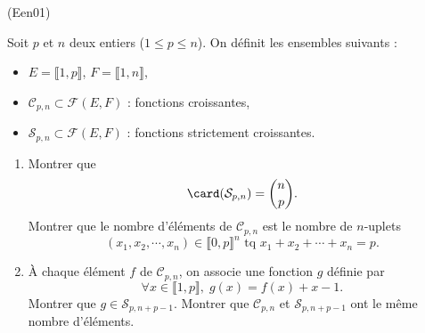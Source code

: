 \begin{tiny}(Een01)\end{tiny} 
Soit $p$ et $n$ deux entiers ($1\leq p\leq n$). On définit les ensembles suivants :
\begin{itemize}
 \item $E = \llbracket 1,p \rrbracket$,  $F = \llbracket 1,n \rrbracket$,
 \item $\mathcal{C}_{p,n}\subset \mathcal{F}(E,F)$ : fonctions croissantes,
 \item $\mathcal{S}_{p,n}\subset \mathcal{F}(E,F)$ : fonctions strictement croissantes.
\end{itemize}
\begin{enumerate}
\item  Montrer que 
\begin{displaymath}
\card(\mathcal{S}_{p,n})= \binom{n}{p}.
\end{displaymath}
Montrer que le nombre d'{\'e}l{\'e}ments de $\mathcal{C}_{p,n}$ est le nombre de $n$-uplets 
\begin{displaymath}
 \left( x_{1},x_{2},\cdots ,x_{n}\right)\in\llbracket 0,p \rrbracket^n \text{ tq } x_{1}+x_{2}+\cdots +x_{n}=p.
\end{displaymath}
\item  \`A chaque {\'e}l{\'e}ment $f$ de $\mathcal{C}_{p,n}$, on associe une fonction $g$ d{\'e}finie par
\[
\forall x\in \llbracket 1, p\rrbracket ,\;g(x) = f(x) + x - 1 .
\]
Montrer que $g\in \mathcal{S}_{p,n+p-1}$. Montrer que $\mathcal{C}_{p,n}$ et $\mathcal{S}_{p,n+p-1}$ ont le m{\^e}me nombre d'{\'e}l{\'e}ments.
\end{enumerate}